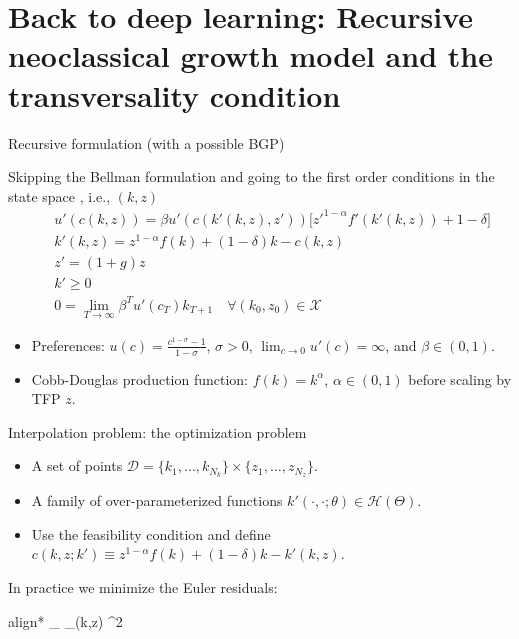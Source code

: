 \documentclass[aspectratio=169,10pt]{beamer}
\newcommand{\Xdom}{\mathcal{X}}
\begin{document}
\section{\textcolor{PennBlue}{Back to deep learning: Recursive neoclassical growth model and the transversality condition }}

\begin{frame}{Recursive formulation (with a possible BGP)}
	
	Skipping the Bellman formulation and going to the first order conditions in the state space , i.e., $(k,z)$
	\begin{align*}
		\quad & u'(c(k,z)) = \beta  u'(c(k'(k,z),z'))\big[z'^{1-\alpha}f'(k'(k,z))+ 1 -\delta\big]                                          \\
		\quad & k'(k,z) = z^{1-\alpha}f(k) + (1-\delta)k - c(k,z)                                                                          \\
		\quad & z' = (1+g)z                                                                                                                \\
		& k'\geq0                                                                                       \\
		\quad & 0 = \lim_{T\rightarrow \infty} \beta^T  u'(c_T)k_{T+1}\label{eq:transversality-req-rbc-sequential} \quad \forall (k_0,z_0)\in \Xdom
	\end{align*}
	\begin{itemize}
		\item Preferences: $u(c) = \frac{c^{1-\sigma}-1}{1-\sigma}$, $\sigma > 0$, $\lim_{c\rightarrow 0} u'(c) = \infty$, and $\beta \in (0,1)$.			\smallskip
		\item Cobb-Douglas production function: $f(k) = k^{\alpha}$, $\alpha \in (0,1)$ before scaling by TFP $z$.
	\end{itemize}
\end{frame}

\begin{frame}{Interpolation problem: the optimization problem}
	\begin{itemize}
		\item A set of points $\mathcal{D} = \{k_1,\ldots,k_{N_k}\}\times \{z_1,\ldots,z_{N_z}\}$.
		\item A family of over-parameterized  functions $k'(\cdot,\cdot;\theta) \in \mathcal{H}(\Theta)$.
		\item Use the feasibility condition and define $c(k,z;k') \equiv z^{1-\alpha} f(k)+(1-\delta)k-k'(k,z)$.
	\end{itemize}
	
	
	In practice we minimize the Euler residuals: 
	\begin{empheq}[box=\tcbhighmath]{align*}
		\min_{\theta \in \Theta} \sum_{(k,z) \in {}} ^2
	\end{empheq}
\end{frame}
\end{document}
